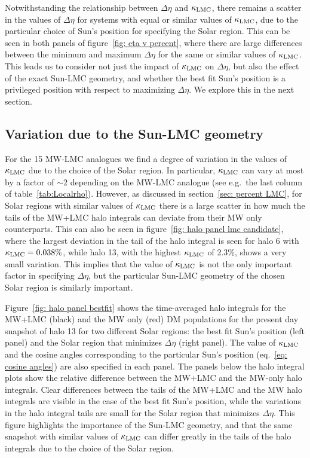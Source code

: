 Notwithstanding the relationship between $\Delta\eta$ and $\kappa_{\rm LMC}$, there remains a scatter in the values of $\Delta\eta$ for systems with equal or similar values of $\kappa_{\rm LMC}$,  due to the particular choice of Sun's position for specifying the Solar region. This can be seen in both panels of figure~\ref{fig: eta v percent}, where there are large differences between the minimum and maximum $\Delta \eta$ for  the same or similar values of $\kappa_{\rm LMC}$. 
This leads us to consider not just the impact of $\kappa_{\rm LMC}$ on $\Delta \eta$, but also the effect of the exact Sun-LMC geometry, and whether the best fit Sun's position is a privileged position with respect to maximizing $\Delta\eta$. We explore this in the next section. 





\subsection{Variation due to the Sun-LMC geometry}
\label{sec: Variation due to Sun-LMC Geometry}


For the 15 MW-LMC analogues we find a degree of variation in the values of $\kappa_{\rm LMC}$  due to the choice of the Solar region. In particular, $\kappa_{\rm LMC}$ can vary at most by a factor of $\sim 2$ depending on the MW-LMC analogue (see e.g.~the last column of table~\ref{tab:Localrho}). However, as discussed in section~\ref{sec: percent LMC}, for Solar regions with similar values of $\kappa_{\rm LMC}$ there is a large scatter in how much the tails of the MW+LMC halo integrals can deviate from their MW only counterparts.  This can also be seen in figure~\ref{fig: halo panel lmc candidate}, where the largest deviation in the tail of the halo integral is seen for halo 6 with $\kappa_{\rm LMC}=0.038\%$, while halo 13, with the highest $\kappa_{\rm LMC}$ of 2.3\%, shows a very small variation. 
This implies that the  value of $\kappa_{\rm LMC}$ is not the only important factor in specifying $\Delta \eta$, but  the particular Sun-LMC geometry of the chosen Solar region is similarly important.%



Figure~\ref{fig: halo panel bestfit} shows the time-averaged halo integrals for the MW+LMC (black) and the MW only (red) DM populations for the present day snapshot of halo 13 for two different Solar regions: the best fit Sun's position (left panel) and the Solar region that minimizes $\Delta\eta$ (right panel). The value of $\kappa_{\rm LMC}$ and the cosine angles corresponding to the particular Sun's position (eq.~\eqref{eq: cosine angles}) are also specified in each panel. The panels below the halo integral plots show the relative difference between the MW+LMC and the MW-only halo integrals. Clear differences between the tails of the MW+LMC and the MW halo integrals are visible in the case of the best fit Sun's position, while the variations in the halo integral tails are small for the Solar region that minimizes $\Delta \eta$. This figure highlights the importance of the Sun-LMC geometry, and that the same snapshot with similar values of $\kappa_{\rm LMC}$  can differ greatly in the tails of the halo integrals due to the choice of the Solar region. 


